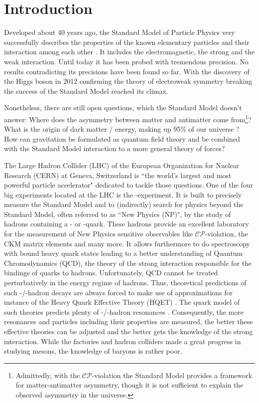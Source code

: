 \chapter{Introduction}
\label{sec:Introduction}
Developed about 40 years ago, the Standard Model of Particle Physics very successfully describes the properties of the known elementary particles and their interaction among each other \cite{SM_Glashow, SM_Salam, SM_Weinberg}.
It includes the electromagnetic, the strong and the weak interaction.
Until today it has been probed with tremendous precision.
No results contradicting its precisions have been found so far.
With the discovery of the Higgs boson in 2012 \cite{Higgs_ATLAS, Higgs_CMS} confirming the theory of electroweak symmetry breaking the success of the Standard Model reached its climax.

Nonetheless, there are still open questions, which the Standard Model doesn't answer:
Where does the asymmetry between matter and antimatter come from\footnote{Admittedly, with the $\mathcal{CP}$-violation the Standard Model provides a framework for matter-antimatter asymmetry, though it is not sufficient to explain the observed asymmetry in the universe.}?
What is the origin of dark matter / energy, making up 95\% of our universe \cite{Planck_Universe}?
How can gravitation be formulated as quantum field theory and be combined with the Standard Model interaction to a more general theory of forces?

The Large Hadron Collider (LHC) of the European Organization for Nuclear Research (CERN) at Geneva, Switzerland is ``the world's largest and most powerful particle accelerator" \cite{CERN_LHC_web} dedicated to tackle those questions.
One of the four big experiments located at the LHC is the \lhcb-experiment.
It is built to precisely measure the Standard Model and to (indirectly) search for physics beyond the Standard Model, often referred to as ``New Physics (NP)", by the study of hadrons containing a \bquark- or \cquark-quark.
These hadrons provide an excellent laboratory for the measurement of New Physics sensitive observables like $\mathcal{CP}$-violation, the CKM matrix elements and many more.
It allows furthermore to do spectroscopy with bound heavy quark states leading to a better understanding of Quantum Chromodynamics (QCD), the theory of the strong interaction responsible for the bindings of quarks to hadrons.
Unfortunately, QCD cannot be treated perturbatively in the energy regime of hadrons.
Thus, theoretical predictions of such \bquark-/\cquark-hadron decays are always forced to make use of approximations for instance of the Heavy Quark Effective Theory (HQET) \cite{HQET_Introduction}.
The quark model of such theories predicts plenty of \bquark-/\cquark-hadron resonances \cite{cBaryons_Predictions}.
Consequently, the more resonances and particles including their properties are measured, the better these effective theories can be adjusted and the better gets the knowledge of the strong interaction.
While the \B factories and hadron colliders made a great progress in studying \bquark mesons, the knowledge of \bquark baryons is rather poor.


